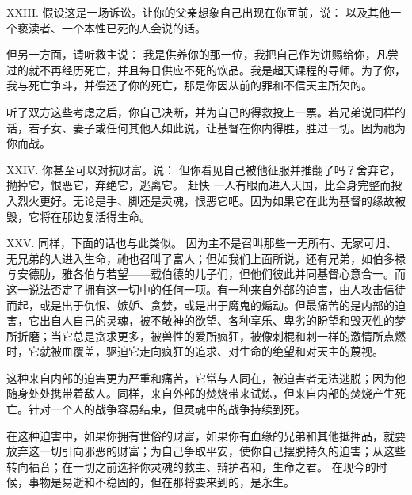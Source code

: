XXIII. 假设这是一场诉讼。让你的父亲想象自己出现在你面前，说： 以及其他一个亵渎者、一个本性已死的人会说的话。\par

但另一方面，请听救主说：  我是供养你的那一位，我把自己作为饼赐给你，凡尝过的就不再经历死亡，并且每日供应不死的饮品。我是超天课程的导师。为了你，我与死亡争斗，并偿还了你的死亡，那是你因从前的罪和不信天主所欠的。\par

听了双方这些考虑之后，你自己决断，并为自己的得救投上一票。若兄弟说同样的话，若子女、妻子或任何其他人如此说，让基督在你内得胜，胜过一切。因为祂为你而战。\par

XXIV. 你甚至可以对抗财富。说： 但你看见自己被他征服并推翻了吗？舍弃它，抛掉它，恨恶它，弃绝它，逃离它。 赶快   一人有眼而进入天国，比全身完整而投入烈火更好。无论是手、脚还是灵魂，恨恶它吧。因为如果它在此为基督的缘故被毁，它将在那边复活得生命。\par

XXV. 同样，下面的话也与此类似。 因为主不是召叫那些一无所有、无家可归、无兄弟的人进入生命，祂也召叫了富人；但如我们上面所说，还有兄弟，如伯多禄与安德肋，雅各伯与若望——载伯德的儿子们，但他们彼此并同基督心意合一。而 这一说法否定了拥有这一切中的任何一项。有一种来自外部的迫害，由人攻击信徒而起，或是出于仇恨、嫉妒、贪婪，或是出于魔鬼的煽动。但最痛苦的是内部的迫害，它出自人自己的灵魂，被不敬神的欲望、各种享乐、卑劣的盼望和毁灭性的梦所折磨；当它总是贪求更多，被兽性的爱所疯狂，被像刺棍和刺一样的激情所点燃时，它就被血覆盖，驱迫它走向疯狂的追求、对生命的绝望和对天主的蔑视。\par

这种来自内部的迫害更为严重和痛苦，它常与人同在，被迫害者无法逃脱；因为他随身处处携带着敌人。同样，来自外部的焚烧带来试炼，但来自内部的焚烧产生死亡。针对一个人的战争容易结束，但灵魂中的战争持续到死。\par

在这种迫害中，如果你拥有世俗的财富，如果你有血缘的兄弟和其他抵押品，就要放弃这一切引向邪恶的财富；为自己争取平安，使你自己摆脱持久的迫害；从这些转向福音；在一切之前选择你灵魂的救主、辩护者和，生命之君。  在现今的时候，事物是易逝和不稳固的，但在那将要来到的，是永生。\par

